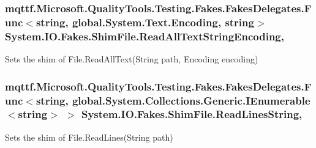 \hypertarget{class_system_1_1_i_o_1_1_fakes_1_1_shim_file_a5522b07e6aea4bb8155b06f53de8cb45}{
\subsubsection[{Read\-All\-Text\-String\-Encoding}]{\setlength{\rightskip}{0pt plus 5cm}mqttf.\-Microsoft.\-Quality\-Tools.\-Testing.\-Fakes.\-Fakes\-Delegates.\-Func$<$string, global.\-System.\-Text.\-Encoding, string$>$ System.\-I\-O.\-Fakes.\-Shim\-File.\-Read\-All\-Text\-String\-Encoding\hspace{0.3cm}{\ttfamily [static]}, {\ttfamily [set]}}}\label{class_system_1_1_i_o_1_1_fakes_1_1_shim_file_a5522b07e6aea4bb8155b06f53de8cb45}


Sets the shim of File.\-Read\-All\-Text(\-String path, Encoding encoding)

\hypertarget{class_system_1_1_i_o_1_1_fakes_1_1_shim_file_ac0ef654ecb8832fa871e7db459328c93}{
\subsubsection[{Read\-Lines\-String}]{\setlength{\rightskip}{0pt plus 5cm}mqttf.\-Microsoft.\-Quality\-Tools.\-Testing.\-Fakes.\-Fakes\-Delegates.\-Func$<$string, global.\-System.\-Collections.\-Generic.\-I\-Enumerable$<$string$>$ $>$ System.\-I\-O.\-Fakes.\-Shim\-File.\-Read\-Lines\-String\hspace{0.3cm}{\ttfamily [static]}, {\ttfamily [set]}}}\label{class_system_1_1_i_o_1_1_fakes_1_1_shim_file_ac0ef654ecb8832fa871e7db459328c93}


Sets the shim of File.\-Read\-Lines(\-String path)

